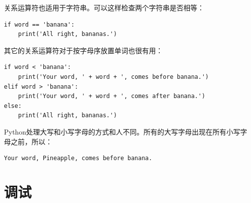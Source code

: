 
关系运算符也适用于字符串。可以这样检查两个字符串是否相等：

\begin{lstlisting}
if word == 'banana':
    print('All right, bananas.')
\end{lstlisting}

%

其它的关系运算符对于按字母序放置单词也很有用：

\begin{lstlisting}
if word < 'banana':
    print('Your word, ' + word + ', comes before banana.')
elif word > 'banana':
    print('Your word, ' + word + ', comes after banana.')
else:
    print('All right, bananas.')
\end{lstlisting}

%

Python处理大写和小写字母的方式和人不同。所有的大写字母出现在所有小写字母之前，所以：

\begin{lstlisting}
Your word, Pineapple, comes before banana.
\end{lstlisting}

%

\section{调试}
  


